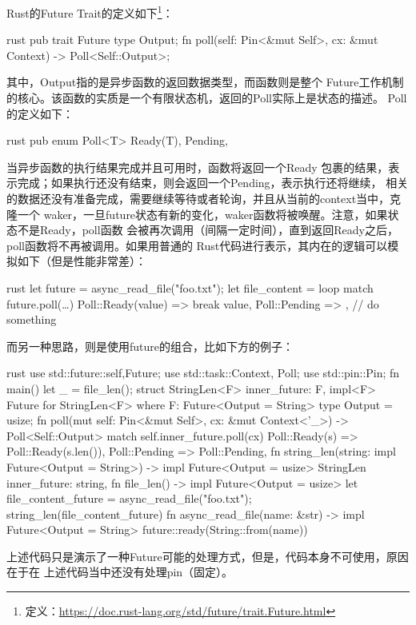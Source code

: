 Rust的Future Trait的定义如下\footnote{定义：\url{https://doc.rust-lang.org/std/future/trait.Future.html}}：
\begin{code-block}{rust}
pub trait Future {
    type Output;
    fn poll(self: Pin<&mut Self>, cx: &mut Context) -> Poll<Self::Output>;
}
\end{code-block}
其中，Output指的是异步函数的返回数据类型，而函数则是整个
Future工作机制的核心。该函数的实质是一个有限状态机，返回的Poll实际上是状态的描述。
Poll的定义如下：
\begin{code-block}{rust}
pub enum Poll<T> {
    Ready(T),
    Pending,
}
\end{code-block}
当异步函数的执行结果完成并且可用时，函数将返回一个Ready
包裹的结果，表示完成；如果执行还没有结束，则会返回一个Pending，表示执行还将继续，
相关的数据还没有准备完成，需要继续等待或者轮询，并且从当前的context当中，克隆一个
waker，一旦future状态有新的变化，waker函数将被唤醒。注意，如果状态不是Ready，poll函数
会被再次调用（间隔一定时间），直到返回Ready之后，poll函数将不再被调用。如果用普通的
Rust代码进行表示，其内在的逻辑可以模拟如下（但是性能非常差）：
\begin{code-block}{rust}
let future = async_read_file("foo.txt");
let file_content = loop {
    match future.poll(…) {
        Poll::Ready(value) => break value,
        Poll::Pending => {}, // do something
    }
}
\end{code-block}

而另一种思路，则是使用future的组合，比如下方的例子：
\begin{code-block}{rust}
use std::future::{self,Future};
use std::task::{Context, Poll};
use std::pin::Pin;
fn main() {
    let _ = file_len();
}
struct StringLen<F> {
    inner_future: F,
}
impl<F> Future for StringLen<F> where F: Future<Output = String>{
    type Output = usize;
    fn poll(mut self: Pin<&mut Self>, cx: &mut Context<'_>) -> Poll<Self::Output> {
        match self.inner_future.poll(cx) {
            Poll::Ready(s) => Poll::Ready(s.len()),
            Poll::Pending => Poll::Pending,
        }
    }
}
fn string_len(string: impl Future<Output = String>)
    -> impl Future<Output = usize>
{
    StringLen {
        inner_future: string,
    }
}
fn file_len() -> impl Future<Output = usize> {
    let file_content_future = async_read_file("foo.txt");
    string_len(file_content_future)
}
fn async_read_file(name: &str) -> impl Future<Output = String> {
    future::ready(String::from(name))
}
\end{code-block}
\begin{attention}
上述代码只是演示了一种Future可能的处理方式，但是，代码本身不可使用，原因在于在
上述代码当中还没有处理pin（固定）。
\end{attention}

